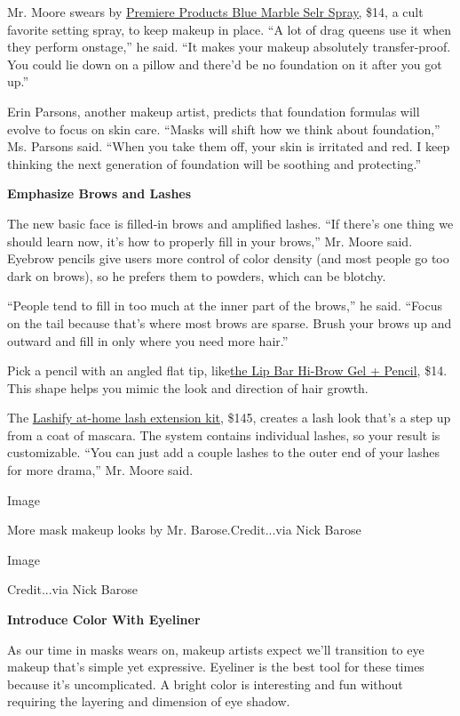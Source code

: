 Mr. Moore swears by
\href{https://www.ppipremiereproducts.com/products/blue-marble-selr}{Premiere
Products Blue Marble Selr Spray,} \$14, a cult favorite setting spray,
to keep makeup in place. ``A lot of drag queens use it when they perform
onstage,'' he said. ``It makes your makeup absolutely transfer-proof.
You could lie down on a pillow and there'd be no foundation on it after
you got up.''

Erin Parsons, another makeup artist, predicts that foundation formulas
will evolve to focus on skin care. ``Masks will shift how we think about
foundation,'' Ms. Parsons said. ``When you take them off, your skin is
irritated and red. I keep thinking the next generation of foundation
will be soothing and protecting.''

\textbf{Emphasize Brows and Lashes}

The new basic face is filled-in brows and amplified lashes. ``If there's
one thing we should learn now, it's how to properly fill in your
brows,'' Mr. Moore said. Eyebrow pencils give users more control of
color density (and most people go too dark on brows), so he prefers them
to powders, which can be blotchy.

``People tend to fill in too much at the inner part of the brows,'' he
said. ``Focus on the tail because that's where most brows are sparse.
Brush your brows up and outward and fill in only where you need more
hair.''

Pick a pencil with an angled flat tip,
like\href{https://www.thelipbar.com/products/hi-brow}{the Lip Bar
Hi-Brow Gel + Pencil}, \$14. This shape helps you mimic the look and
direction of hair growth.

The \href{https://lashify.com/}{Lashify at-home lash extension kit},
\$145, creates a lash look that's a step up from a coat of mascara. The
system contains individual lashes, so your result is customizable. ``You
can just add a couple lashes to the outer end of your lashes for more
drama,'' Mr. Moore said.

Image

More mask makeup looks by Mr. Barose.Credit...via Nick Barose

Image

Credit...via Nick Barose

\textbf{Introduce Color With Eyeliner}

As our time in masks wears on, makeup artists expect we'll transition to
eye makeup that's simple yet expressive. Eyeliner is the best tool for
these times because it's uncomplicated. A bright color is interesting
and fun without requiring the layering and dimension of eye shadow.

